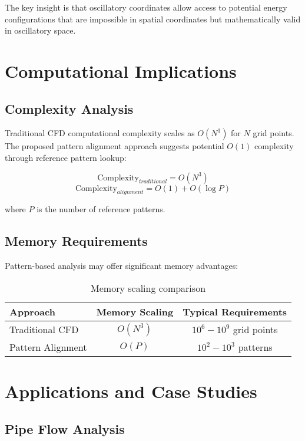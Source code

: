 \documentclass[12pt,a4paper]{article}
\begin{document}
The key insight is that oscillatory coordinates allow access to potential energy configurations that are impossible in spatial coordinates but mathematically valid in oscillatory space.

\section{Computational Implications}

\subsection{Complexity Analysis}

Traditional CFD computational complexity scales as $O(N^3)$ for $N$ grid points. The proposed pattern alignment approach suggests potential $O(1)$ complexity through reference pattern lookup:

\begin{equation}
\text{Complexity}_{traditional} = O(N^3)
\end{equation}
\begin{equation}
\text{Complexity}_{alignment} = O(1) + O(\log P)
\end{equation}

where $P$ is the number of reference patterns.

\subsection{Memory Requirements}

Pattern-based analysis may offer significant memory advantages:

\begin{table}[H]
\centering
\begin{tabular}{lcc}
\toprule
Approach & Memory Scaling & Typical Requirements \\
\midrule
Traditional CFD & $O(N^3)$ & $10^6 - 10^9$ grid points \\
Pattern Alignment & $O(P)$ & $10^2 - 10^3$ patterns \\
\bottomrule
\end{tabular}
\caption{Memory scaling comparison}
\end{table}

\section{Applications and Case Studies}

\subsection{Pipe Flow Analysis}
\end{document}
